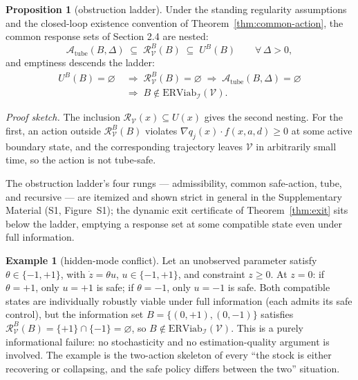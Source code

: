 \documentclass[10pt,twocolumn]{article}
\theoremstyle{definition}
\newtheorem{proposition}{Proposition}
\newtheorem{example}{Example}
\begin{document}
\begin{proposition}[obstruction ladder]\label{prop:ladder}
Under the standing regularity assumptions and the closed-loop existence
convention of Theorem~\ref{thm:common-action}, the common response sets
of Section 2.4 are nested:
\[\mathcal{A}_{\mathrm{tube}}(B,\Delta) \;\subseteq\; \mathcal{R}_{\mathcal{V}}^B(B) \;\subseteq\; U^B(B) \qquad \forall\,\Delta>0,\]
and emptiness descends the ladder:
\[
\begin{aligned}
U^B(B)=\varnothing \;&\Longrightarrow\; \mathcal{R}_{\mathcal{V}}^B(B)=\varnothing \;\Longrightarrow\; \mathcal{A}_{\mathrm{tube}}(B,\Delta)=\varnothing \\
&\Longrightarrow\; B\notin\mathrm{ERViab}_{\mathcal{I}}(\mathcal{V}).
\end{aligned}
\]
\end{proposition}

\emph{Proof sketch.} The inclusion \(\mathcal{R}_{\mathcal{V}}(x) \subseteq U(x)\) gives the second nesting. For the first, an action outside \(\mathcal{R}_{\mathcal{V}}^B(B)\) violates \(\nabla q_j(x) \cdot f(x, a, d) \ge 0\) at some active boundary state, and the corresponding trajectory leaves \(\mathcal{V}\) in arbitrarily small time, so the action is not tube-safe.

The obstruction ladder's four rungs --- admissibility, common safe-action, tube, and recursive --- are itemized and shown strict in general in the Supplementary Material (S1, Figure~S1); the dynamic exit certificate of Theorem~\ref{thm:exit} sits below the ladder, emptying a response set at some compatible state even under full information.

\begin{example}[hidden-mode conflict]\label{ex:hidden-mode} Let an unobserved parameter satisfy
\(\theta \in \{-1, +1\}\), with \(\dot z = \theta u\),
\(u \in \{-1, +1\}\), and constraint \(z \ge 0\). At \(z = 0\): if
\(\theta = +1\), only \(u = +1\) is safe; if \(\theta = -1\), only
\(u = -1\) is safe. Both compatible states are individually robustly
viable under full information (each admits its safe control), but the
information set \(B = \{(0, +1), (0, -1)\}\) satisfies
\(\mathcal{R}_{\mathcal{V}}^B(B) = \{+1\} \cap \{-1\} = \varnothing\),
so \(B \notin \mathrm{ERViab}_{\mathcal{I}}(\mathcal{V})\). This is a
purely informational failure: no stochasticity and no estimation-quality
argument is involved. The example is the two-action skeleton of every
``the stock is either recovering or collapsing, and the safe policy
differs between the two'' situation.

\end{example}
\end{document}
